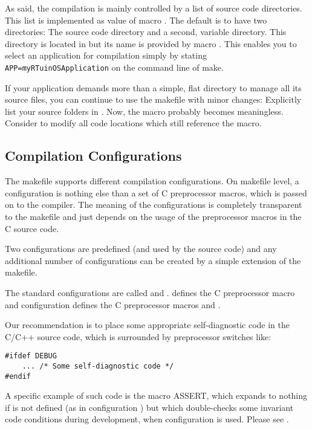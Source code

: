 As said, the compilation is mainly controlled by a list of source code
directories. This list is implemented as value of macro
. The default is to have two directories: The \rtos{}
source code directory  and a second,
variable directory. This directory is located in
 but its name is provided by macro
. This enables you to select an application for compilation
simply by stating \verb+APP=myRTuinOSApplication+ on the command line of
make.

If your application demands more than a simple, flat directory to manage
all its source files, you can continue to use the makefile with minor
changes: Explicitly list your source folders in . Now,
the macro  probably becomes meaningless. Consider to modify all
code locations which still reference the macro.


\subsection{Compilation Configurations}

The makefile supports different compilation configurations. On makefile
level, a configuration is nothing else than a set of C preprocessor
macros, which is passed on to the compiler. The meaning of the
configurations is completely transparent to the makefile and just depends
on the usage of the preprocessor macros in the C source code.

Two configurations are predefined (and used by the \rtos{} source code)
and any additional number of configurations can be created by a simple
extension of the makefile.

The standard configurations are called  and
.  defines the C preprocessor macro
 and configuration  defines the C
preprocessor macros  and .

Our recommendation is to place some appropriate self-diagnostic code in
the C/C++ source code, which is surrounded by preprocessor switches like:
\begin{verbatim}
#ifdef DEBUG
    ... /* Some self-diagnostic code */
#endif
\end{verbatim}

A specific example of such code is the macro ASSERT, which expands to
nothing if  is not defined (as in configuration
) but which double-checks some invariant code conditions
during development, when configuration  is used. Please see
.


